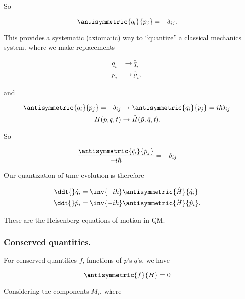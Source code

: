 So 

\begin{equation}\label{eqn:phaseSpaceAndTrajectories:190}
\antisymmetric{q_i}{p_j} = -\delta_{ij}.
\end{equation}

This provides a systematic (axiomatic) way to ``quantize'' a classical mechanics system, where we make replacements

\begin{align}\label{eqn:phaseSpaceAndTrajectories:210}
q_i &\rightarrow \hat{q}_i \\
p_i &\rightarrow \hat{p}_i,
\end{align}

and

\begin{align}\label{eqn:phaseSpaceAndTrajectories:230}
\antisymmetric{q_i}{p_j} = -\delta_{ij} &\rightarrow 
\antisymmetric{q_i}{p_j} = i \hbar \delta_{ij} \\
H(p, q, t) &\rightarrow \hat{H}(\hat{p}, \hat{q}, t).
\end{align}

So 

\begin{equation}\label{eqn:phaseSpaceAndTrajectories:250}
\frac{\antisymmetric{\hat{q}_i}{\hat{p}_j}}{-i \hbar } = - \delta_{ij}
\end{equation}

Our quantization of time evolution is therefore

\begin{align}\label{eqn:phaseSpaceAndTrajectories:270}
\ddt{} \hat{q}_i &= \inv{-i\hbar} \antisymmetric{\hat{H}}{\hat{q}_i} \\
\ddt{} \hat{p}_i &= \inv{-i\hbar} \antisymmetric{\hat{H}}{\hat{p}_i}.
\end{align}

These are the Heisenberg equations of motion in QM.

\subsubsection{Conserved quantities.}

For conserved quantities $f$, functions of $p$'s $q$'s, we have

\begin{equation}\label{eqn:phaseSpaceAndTrajectories:290}
\antisymmetric{f}{H} = 0
\end{equation}

Considering the components $M_i$, where 


